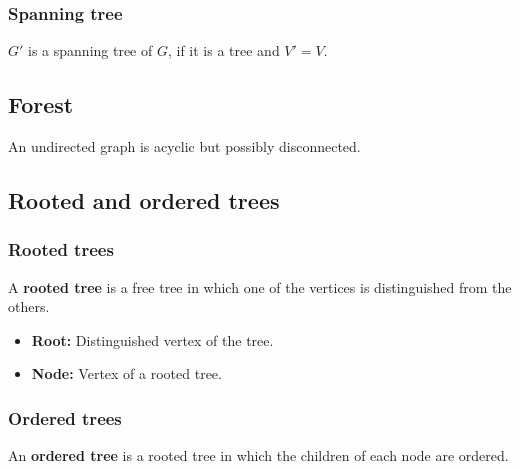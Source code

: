 \subsubsection{Spanning tree}
\begin{definition}
    $G'$ is a spanning tree of $G$, if it is a tree and $V'=V$.
\end{definition}

\subsection{Forest}
\begin{definition}
    An undirected graph is acyclic but possibly disconnected.
\end{definition}


\subsection{Rooted and ordered trees}
    \subsubsection{Rooted trees}
    \begin{definition}
        A \textbf{rooted tree} is a free tree in which one of the vertices is distinguished from the others.
        \begin{itemize}
            \item \textbf{Root:} Distinguished vertex of the tree.
            \item \textbf{Node:} Vertex of a rooted tree.
        \end{itemize}
    \end{definition}
    
    \subsubsection{Ordered trees}
    \begin{definition}
        An \textbf{ordered tree} is a rooted tree in which the children of each node are ordered.
    \end{definition}


